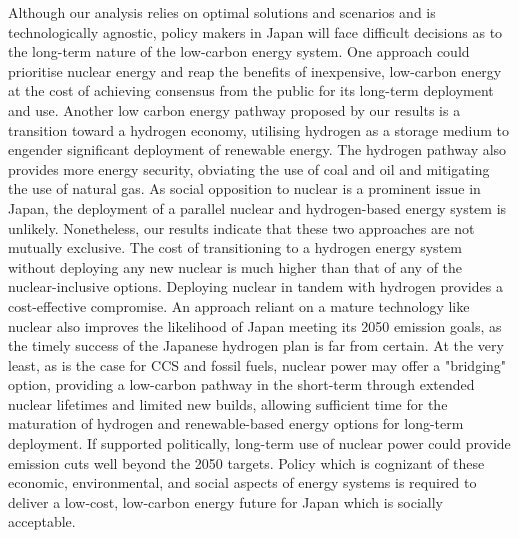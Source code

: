 Although our analysis relies on optimal solutions and scenarios and is technologically agnostic, policy makers in Japan will face difficult decisions as to the long-term nature of the low-carbon energy system. One approach could prioritise nuclear energy and reap the benefits of inexpensive, low-carbon energy at the cost of achieving consensus from the public for its long-term deployment and use. Another low carbon energy pathway proposed by our results is a transition toward a hydrogen economy, utilising hydrogen as a storage medium to engender significant deployment of renewable energy. The hydrogen pathway also provides more energy security, obviating the use of coal and oil and mitigating the use of natural gas. As social opposition to nuclear is a prominent issue in Japan, the deployment of a parallel nuclear and hydrogen-based energy system is unlikely. Nonetheless, our results indicate that these two approaches are not mutually exclusive. The cost of transitioning to a hydrogen energy system without deploying any new nuclear is much higher than that of any of the nuclear-inclusive options. Deploying nuclear in tandem with hydrogen provides a cost-effective compromise. An approach reliant on a mature technology like nuclear also improves the likelihood of Japan meeting its 2050 emission goals, as the timely success of the Japanese hydrogen plan is far from certain. At the very least, as is the case for CCS and fossil fuels, nuclear power may offer a "bridging" option, providing a low-carbon pathway in the short-term through extended nuclear lifetimes and limited new builds, allowing sufficient time for the maturation of hydrogen and renewable-based energy options for long-term deployment. If supported politically, long-term use of nuclear power could provide emission cuts well beyond the 2050 targets. Policy which is cognizant of these economic, environmental, and social aspects of energy systems is required to deliver a low-cost, low-carbon energy future for Japan which is socially acceptable.